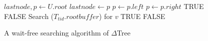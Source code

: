 \begin{figure}[!t] \centering \begin{algorithmic}[1]
\small
{}
\State $lastnode, p \gets U.root$
	\label{lst:line:searchifleaf}
    \State $lastnode \gets p$	\label{lst:line:lasnode-p}
        		\label{lst:line:searchless}
            \State $p \gets p.left$
        \Else					\label{lst:line:searchelse}
            \State $p \gets p.right$
        \EndIf
\EndWhile
{} \label{lst:line:linsearch3}
					\label{lst:line:linsearch1}
		\State \Return TRUE 
	\Else
		\State \Return FALSE
	\EndIf
\Else \State Search ($T_{tid}.rootbuffer$) for $v$	\label{lst:line:searchbuffer}
								\label{lst:line:linsearch2}
\State\Return TRUE \Else \State\Return FALSE \EndIf \EndIf \EndFunction
\end{algorithmic}
\caption{A wait-free searching algorithm of $\Delta$Tree}\label{lst:nodeSearch}
\end{figure}

